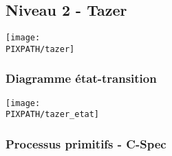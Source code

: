 \subsection{Niveau 2 - Tazer}

\begin{center}
\texttt{[image: \\PIXPATH/tazer]}
\end{center}


\subsubsection{Diagramme état-transition}

\begin{center}
\texttt{[image: \\PIXPATH/tazer\_etat]}
\end{center}

\vfill
\pagebreak

\subsubsection{Processus primitifs - C-Spec}

